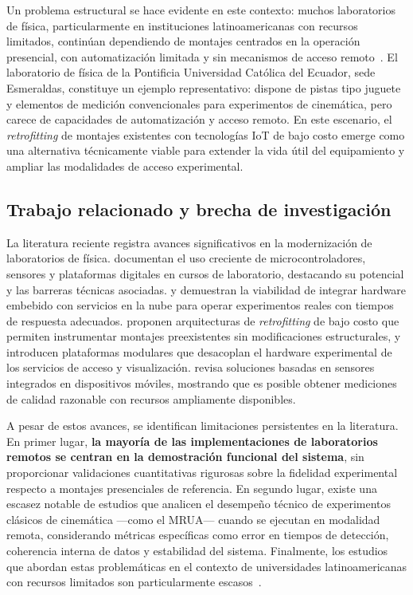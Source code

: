 \documentclass{espol-rte}
\begin{document}
Un problema estructural se hace evidente en este contexto: muchos laboratorios de f\'isica, particularmente en instituciones latinoamericanas con recursos limitados, contin\'uan dependiendo de montajes centrados en la operaci\'on presencial, con automatizaci\'on limitada y sin mecanismos de acceso remoto~\parencite{r3,r4}. El laboratorio de f\'isica de la Pontificia Universidad Cat\'olica del Ecuador, sede Esmeraldas, constituye un ejemplo representativo: dispone de pistas tipo juguete y elementos de medici\'on convencionales para experimentos de cinem\'atica, pero carece de capacidades de automatizaci\'on y acceso remoto. En este escenario, el \textit{retrofitting} de montajes existentes con tecnolog\'ias IoT de bajo costo emerge como una alternativa t\'ecnicamente viable para extender la vida \'util del equipamiento y ampliar las modalidades de acceso experimental.

\subsection{Trabajo relacionado y brecha de investigaci\'on}

La literatura reciente registra avances significativos en la modernizaci\'on de laboratorios de f\'isica. \textcite{r1} documentan el uso creciente de microcontroladores, sensores y plataformas digitales en cursos de laboratorio, destacando su potencial y las barreras t\'ecnicas asociadas. \textcite{r4} y \textcite{r3} demuestran la viabilidad de integrar hardware embebido con servicios en la nube para operar experimentos reales con tiempos de respuesta adecuados. \textcite{r2} proponen arquitecturas de \textit{retrofitting} de bajo costo que permiten instrumentar montajes preexistentes sin modificaciones estructurales, y \textcite{r5} introducen plataformas modulares que desacoplan el hardware experimental de los servicios de acceso y visualizaci\'on. \textcite{r6} revisa soluciones basadas en sensores integrados en dispositivos m\'oviles, mostrando que es posible obtener mediciones de calidad razonable con recursos ampliamente disponibles.

A pesar de estos avances, se identifican limitaciones persistentes en la literatura. En primer lugar, \textbf{la mayor\'ia de las implementaciones de laboratorios remotos se centran en la demostraci\'on funcional del sistema}, sin proporcionar validaciones cuantitativas rigurosas sobre la fidelidad experimental respecto a montajes presenciales de referencia. En segundo lugar, existe una escasez notable de estudios que analicen el desempe\~no t\'ecnico de experimentos cl\'asicos de cinem\'atica ---como el MRUA--- cuando se ejecutan en modalidad remota, considerando m\'etricas espec\'ificas como error en tiempos de detecci\'on, coherencia interna de datos y estabilidad del sistema. Finalmente, los estudios que abordan estas problem\'aticas en el contexto de universidades latinoamericanas con recursos limitados son particularmente escasos~\parencite{r13,r14}.
\end{document}
